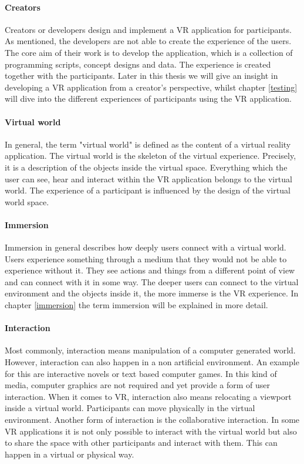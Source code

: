 \paragraph{Creators} Creators or developers design and implement a VR application for participants. As mentioned, the developers are not able to create the experience of the users. The core aim of their work is to develop the application, which is a collection of programming scripts, concept designs and data. The experience is created together with the participants. Later in this thesis we will give an insight in developing a VR application from a creator's perspective, whilst chapter \ref{testing} will dive into the different experiences of participants using the VR application.
\paragraph{Virtual world} In general, the term "virtual world" is defined as the content of a virtual reality application.  The virtual world is the skeleton of the virtual experience. Precisely, it is a description of the objects inside the virtual space. Everything which the user can see, hear and interact within the VR application belongs to the virtual world. The experience of a participant is influenced by the design of the virtual world space.

\paragraph{Immersion} Immersion in general describes how deeply users connect with a virtual world. Users experience something through a medium that they would not be able to experience without it. They see actions and things from a different point of view and can connect with it in some way. The deeper users can connect to the virtual environment and the objects inside it, the more immerse is the VR experience. In chapter \ref{immersion} the term immersion will be explained in more detail.

\paragraph{Interaction} Most commonly, interaction means manipulation of a computer generated world. However, interaction can also happen in a non artificial environment. An example for this are interactive novels or text based computer games. In this kind of media, computer graphics are not required and yet provide a form of user interaction. When it comes to VR, interaction also means relocating a viewport inside a virtual world. Participants can move physically in the virtual environment. Another form of interaction is the collaborative interaction. In some VR applications it is not only possible to interact with the virtual world but also to share the space with other participants and interact with them. This can happen in a virtual or physical way.
